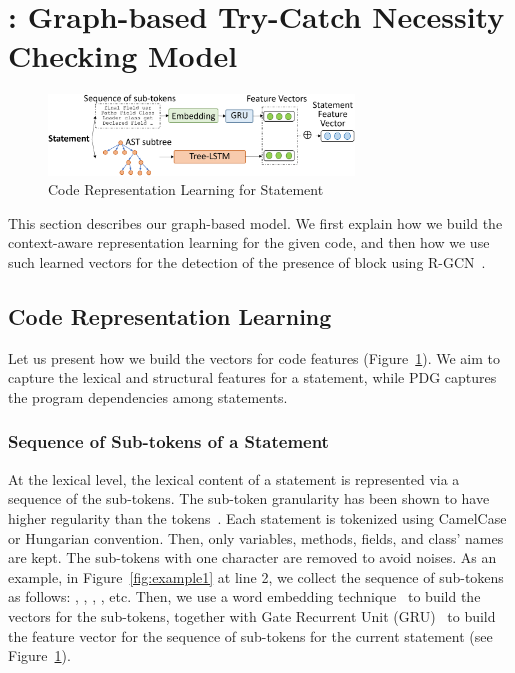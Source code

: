 \section{{\xblock}: Graph-based Try-Catch Necessity Checking Model}
\label{detect:sec}

\begin{figure}[t]
	\centering
	\includegraphics[width=3.2in]{features-2.png}
        \vspace{-0.08in}
	\caption{Code Representation Learning for Statement}
	\label{fig:feature}	
\end{figure}

This section describes our graph-based {\xblock} model. We first
explain how we build the context-aware representation learning for the
given code, and then how we use such learned vectors for the detection
of the presence of  block using R-GCN~\cite{yi}.

\subsection{Code Representation Learning}
\label{replearn:sec}

Let us present how we build the vectors for code features
(Figure~\ref{fig:feature}). We aim to capture the lexical and
structural features for a statement, while PDG captures the program
dependencies among statements.

\vspace{-1pt}
\subsubsection{Sequence of Sub-tokens of a Statement}

At the lexical level, the lexical content of a statement is
represented via a sequence of the sub-tokens. The sub-token
granularity has been shown to have higher regularity than the
tokens~\cite{icse20-methodname}. Each statement is tokenized using
CamelCase or Hungarian convention. Then, only variables, methods,
fields, and class' names are kept. The sub-tokens with one character
are removed to avoid noises. As an example, in
Figure~\ref{fig:example1} at line 2, we collect the sequence of
sub-tokens as follows: , , ,
, etc. Then, we use a word embedding
technique~\cite{glove2014} to build the vectors for the sub-tokens,
together with Gate Recurrent Unit (GRU)~\cite{chung2014empirical} to
build the feature vector for the sequence of sub-tokens for the
current statement (see Figure~\ref{fig:feature}).



